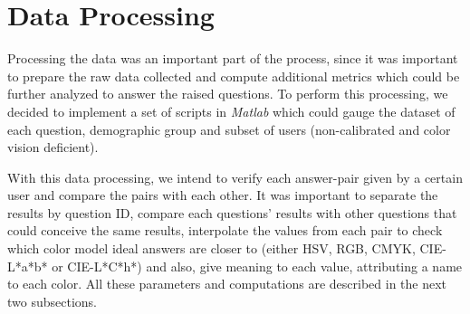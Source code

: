 \section{Data Processing}
\label{sec:results_digest}
%
Processing the data was an important part of the process, since it was important to prepare the raw data collected and compute additional metrics which could be further
analyzed to answer the raised questions. To perform this processing, we decided to implement a set of scripts in \emph{Matlab} which could gauge the dataset of each question,
demographic group and subset of users (non-calibrated and color vision deficient). \par
%
With this data processing, we intend to verify each answer-pair given by a certain user and compare the pairs with each other. It was important to separate the results by question
ID, compare each questions' results with other questions that could conceive the same results, interpolate the values from each pair to check which color model ideal answers are closer
to (either HSV, RGB, CMYK, CIE-L*a*b* or CIE-L*C*h*) and also, give meaning to each value, attributing a name to each color. All these parameters and computations are described in the next two
subsections.
%

